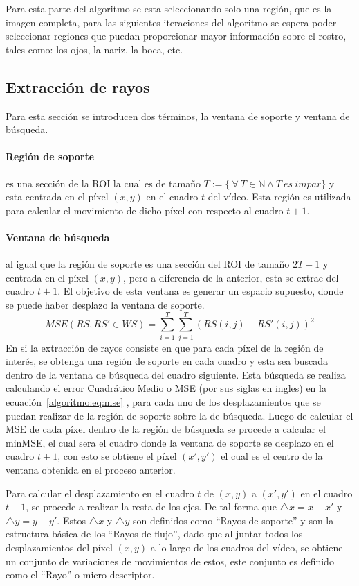 	Para esta parte del algoritmo se esta seleccionando solo una región, que es la imagen completa, para las siguientes iteraciones del algoritmo se espera poder seleccionar regiones que puedan proporcionar mayor información sobre el rostro, tales como: los ojos, la nariz, la boca, etc.

	\subsection{Extracción de rayos}
	\label{algoritmo:ext_rayos}
	Para esta sección se introducen dos términos, la ventana de soporte y ventana de búsqueda.
	\paragraph{Región de soporte} es una sección de la ROI la cual es de tamaño $T :=\{~\forall~T \in \mathds{N} \land T~es~impar\}$ y esta centrada en el píxel $(x,y)$ en el cuadro $t$ del vídeo. Esta región es utilizada para calcular el movimiento de dicho píxel con respecto al cuadro $t+1$.
	\paragraph{Ventana de búsqueda} al igual que la región de soporte es una sección del ROI de tamaño $2T+1$ y centrada en el píxel $(x,y)$, pero a diferencia de la anterior, esta se extrae del cuadro $t+1$. El objetivo de esta ventana es generar un espacio supuesto, donde se puede haber desplazo la ventana de soporte.
		\begin{equation}\label{algoritmo:eq:mse}	
			MSE(RS, RS' \in WS) = \sum_{i=1}^{T} \sum_{j=1}^{T} (RS(i,j) - RS'(i,j))^2
		\end{equation}
	En si la extracción de rayos consiste en que para cada píxel de la región de interés, se obtenga una región de soporte en cada cuadro y esta sea buscada dentro de la ventana de búsqueda del cuadro siguiente. Esta búsqueda se realiza calculando el error Cuadrático Medio o MSE (por sus siglas en ingles) en la ecuación~\ref{algoritmo:eq:mse} , para cada uno de los desplazamientos que se puedan realizar de la región de soporte sobre la de búsqueda. Luego de calcular el MSE de cada píxel dentro de la región de búsqueda se procede a calcular el minMSE, el cual sera el cuadro donde la ventana de soporte se desplazo en el cuadro $t+1$, con esto se obtiene el píxel $(x',y')$ el cual es el centro de la ventana obtenida en el proceso anterior.
	
	Para calcular el desplazamiento en el cuadro $t$ de $(x,y)$ a $(x',y')$ en el cuadro $t+1$, se procede a realizar la resta de los ejes. De tal forma que  $\triangle x = x-x'$ y $ \triangle y = y-y'$. Estos $ \triangle x$ y $ \triangle y$ son definidos como ``Rayos de soporte'' y son la estructura básica de los ``Rayos de flujo'', dado que al juntar todos los desplazamientos del píxel $(x,y)$ a lo largo de los cuadros del vídeo, se obtiene un conjunto de variaciones de movimientos de estos, este conjunto es definido como el ``Rayo'' o micro-descriptor. 
		
